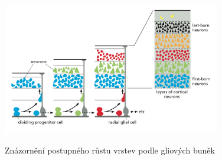 \documentclass[DIV=8]{scrreprt}
\begin{document}
\begin{figure}
    \caption{Znázornění postupného růstu vrstev podle gliových buněk}
    \includegraphics[width=0.85\textwidth]{vrstvy_rust.png}
    \centering
    \label{}
\end{figure}
\end{document}
